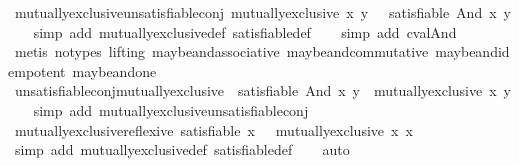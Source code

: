 \begin{isabellebody}
\isamarkupfalse%
\ mutually{\isacharunderscore}exclusive{\isacharunderscore}unsatisfiable{\isacharunderscore}conj{\isacharcolon}\ {\isachardoublequoteopen}mutually{\isacharunderscore}exclusive\ x\ y\ {\isacharequal}\ {\isacharparenleft}{\isasymnot}\ satisfiable\ {\isacharparenleft}And\ x\ y{\isacharparenright}{\isacharparenright}{\isachardoublequoteclose}\isanewline
%
\isadelimproof
\ \ %
\endisadelimproof
%
\isatagproof
{}\isamarkupfalse%
\ {\isacharparenleft}simp\ add{\isacharcolon}\ mutually{\isacharunderscore}exclusive{\isacharunderscore}def\ satisfiable{\isacharunderscore}def{\isacharparenright}\isanewline
\ \ \isamarkupfalse%
\ {\isacharparenleft}simp\ add{\isacharcolon}\ cval{\isacharunderscore}And{\isacharparenright}\isanewline
\ \ \isamarkupfalse%
\ {\isacharparenleft}metis\ {\isacharparenleft}no{\isacharunderscore}types{\isacharcomma}\ lifting{\isacharparenright}\ maybe{\isacharunderscore}and{\isacharunderscore}associative\ maybe{\isacharunderscore}and{\isacharunderscore}commutative\ maybe{\isacharunderscore}and{\isacharunderscore}idempotent\ maybe{\isacharunderscore}and{\isacharunderscore}one{\isacharparenright}%
\endisatagproof
{\isafoldproof}%
%
\isadelimproof
\isanewline
%
\endisadelimproof
\isanewline
{}\isamarkupfalse%
\ unsatisfiable{\isacharunderscore}conj{\isacharunderscore}mutually{\isacharunderscore}exclusive{\isacharcolon}\ {\isachardoublequoteopen}{\isasymnot}\ satisfiable\ {\isacharparenleft}And\ x\ y{\isacharparenright}\ {\isacharequal}\ mutually{\isacharunderscore}exclusive\ x\ y{\isachardoublequoteclose}\isanewline
%
\isadelimproof
\ \ %
\endisadelimproof
%
\isatagproof
{}\isamarkupfalse%
\ {\isacharparenleft}simp\ add{\isacharcolon}\ mutually{\isacharunderscore}exclusive{\isacharunderscore}unsatisfiable{\isacharunderscore}conj{\isacharparenright}%
\endisatagproof
{\isafoldproof}%
%
\isadelimproof
\isanewline
%
\endisadelimproof
\isanewline
{}\isamarkupfalse%
\ mutually{\isacharunderscore}exclusive{\isacharunderscore}reflexive{\isacharcolon}\ {\isachardoublequoteopen}satisfiable\ x\ {\isasymLongrightarrow}\ {\isasymnot}\ mutually{\isacharunderscore}exclusive\ x\ x{\isachardoublequoteclose}\isanewline
%
\isadelimproof
\ \ %
\endisadelimproof
%
\isatagproof
{}\isamarkupfalse%
\ {\isacharparenleft}simp\ add{\isacharcolon}\ mutually{\isacharunderscore}exclusive{\isacharunderscore}def\ satisfiable{\isacharunderscore}def{\isacharparenright}\isanewline
\ \ \isamarkupfalse%
\ auto%
\endisatagproof

\end{isabellebody}
